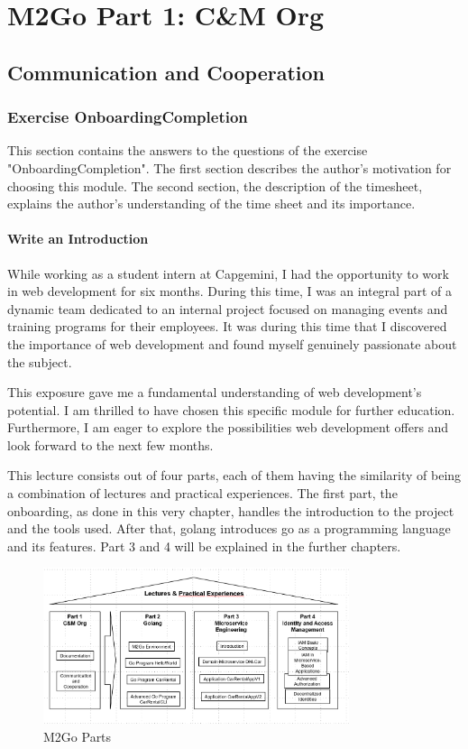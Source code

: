 \chapter{M2Go Part 1: C\&M Org}
\label{cha:cm_org}

\section{Communication and Cooperation}

\subsection{Exercise OnboardingCompletion}
\label{sec:exercise_onboarding_completion}
This section contains the answers to the questions of the exercise "OnboardingCompletion". 
The first section describes the author's motivation for choosing this module. 
The second section, the description of the timesheet, explains the author's understanding of the time sheet and its importance.

\subsubsection*{Write an Introduction}
While working as a student intern at Capgemini, I had the opportunity to work in web development for six months.
During this time, I was an integral part of a dynamic team dedicated to an internal project focused on managing events and training programs for their employees.
It was during this time that I discovered the importance of web development and found myself genuinely passionate about the subject.

This exposure gave me a fundamental understanding of web development's potential.
I am thrilled to have chosen this specific module for further education. 
Furthermore, I am eager to explore the possibilities web development offers and look forward to the next few months.

This lecture consists out of four parts, each of them having the similarity of being a combination of lectures and practical experiences.
The first part, the onboarding, as done in this very chapter, handles the introduction to the project and the tools used.
After that, golang introduces go as a programming language and its features.
Part 3 and 4 will be explained in the further chapters.

\begin{figure}[H]
    \centering
    \includegraphics[width=0.8\textwidth]{figures/onboarding/m2go_parts.png}
    \caption{M2Go Parts}
    \label{fig:m2go_parts}
\end{figure}


